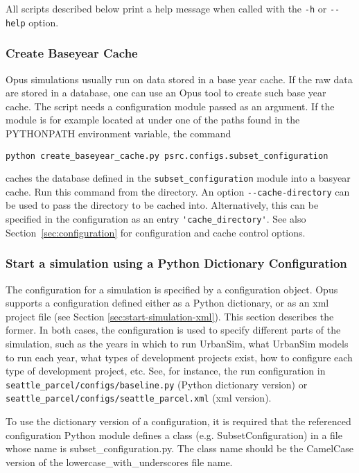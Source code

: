 All scripts described below print a help message when called with the
\verb|-h| or \verb|--help| option.

\subsubsection{Create Baseyear Cache}
\label{sec:run-manager-baseyearcache}
%
Opus simulations usually run on data stored in a base year cache.
If the raw data are stored in a database, 
one can use an Opus tool to create such base year cache.\baseyearcacheindex 
The script needs a configuration module passed as an argument. 
If the module is for example located at
 under one of the paths found in the
PYTHONPATH \pythonpathindex environment variable, \environmentvariablesindex the command
\pythonindex
\begin{verbatim}
python create_baseyear_cache.py psrc.configs.subset_configuration
\end{verbatim}
caches the database defined in the \verb|subset_configuration| module into a basyear
cache. \baseyearcacheindex Run this command from 
the  directory. An option \verb|--cache-directory|
can be used to pass the directory to be cached into. Alternatively, this can be
specified in the configuration as an entry \verb|'cache_directory'|. See also
Section~\ref{sec:configuration} for configuration and cache control options.

\subsubsection{Start a simulation using a Python Dictionary Configuration}

The configuration for a simulation is specified by a configuration object.
Opus supports a configuration defined either as a Python dictionary, or as an xml project file
(see Section \ref{sec:start-simulation-xml}). This section describes the former.
In both cases, the configuration is used to specify different parts
of the simulation, such as the years in which to run UrbanSim, what
UrbanSim models \modelsindex to run each year, what types of development
projects exist, how to configure each type of development project,
etc. See, for instance, the run configuration in
\verb|seattle_parcel/configs/baseline.py| (Python dictionary version) or
\verb|seattle_parcel/configs/seattle_parcel.xml| (xml version).

To use the dictionary version of a configuration, it is required
that the referenced configuration Python module defines
a class (e.g. SubsetConfiguration) in a file whose name is
subset_configuration.py. The class name should be the
CamelCase version of the lowercase_with_underscores file name.


